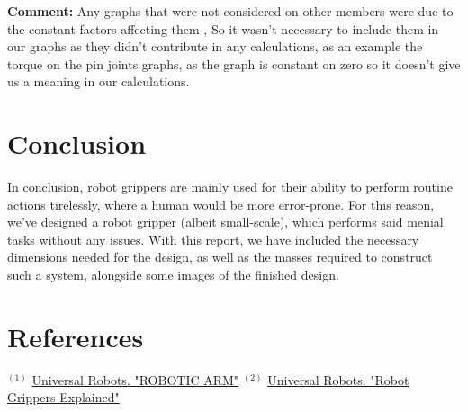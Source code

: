 \documentclass{article}
\begin{document}
\textbf{Comment:} Any graphs that were not considered on other members were due to the constant factors affecting them
, So it wasn't necessary to include them in our graphs as they didn't contribute in any calculations, 
as an example the torque on the pin joints graphs, as the graph is constant on zero so it doesn't 
give us a meaning in our calculations.

\newpage
\section*{Conclusion}
In conclusion, robot grippers are mainly used for their ability to perform routine actions tirelessly,
where a human would be more error-prone. For this reason, we've designed a robot gripper (albeit small-scale), 
which performs said menial tasks without any issues. With this report, we have included the necessary dimensions 
needed for the design, as well as the masses required to construct such a system, alongside some images
of the finished design.

\newpage
\section*{References}
$^{(1)}$ \href{https://www.universal-robots.com/in/blog/robotic-arm/}{Universal Robots. "ROBOTIC ARM"}
$^{(2)}$ \href{https://www.universal-robots.com/blog/robot-grippers-explained/}{Universal Robots. "Robot Grippers Explained"}
\end{document}

